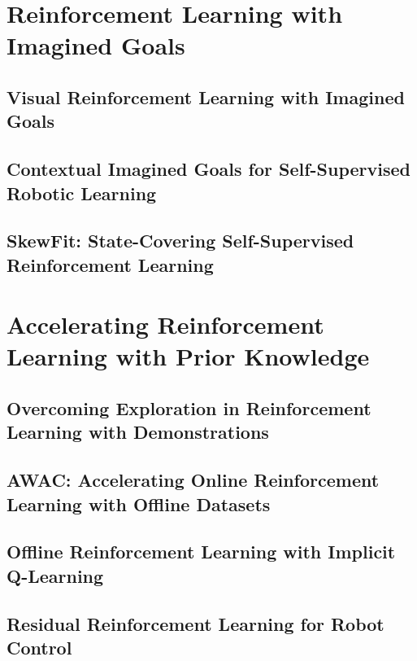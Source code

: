 \documentclass[ titlepage,numbers=noenddot,headinclude,
                footinclude=true,cleardoublepage=empty,abstractoff,
                BCOR=5mm,paper=letter,fontsize=12pt,
                american,
                openany
                ]{scrreprt}
\begin{document}

\part{Reinforcement Learning with Imagined Goals}

\chapter{Visual Reinforcement Learning with Imagined Goals}\label{chapter:rig}


\chapter{Contextual Imagined Goals for Self-Supervised Robotic Learning}\label{chapter:ccrig}

\chapter{SkewFit: State-Covering Self-Supervised Reinforcement Learning}\label{chapter:skewfit}

\part{Accelerating Reinforcement Learning with Prior Knowledge}

\chapter{Overcoming Exploration in Reinforcement Learning with Demonstrations}\label{chapter:bcddpg}

\chapter{AWAC: Accelerating Online Reinforcement Learning with Offline Datasets}\label{chapter:awac}

\chapter{Offline Reinforcement Learning with Implicit Q-Learning}\label{chapter:iql}

\chapter{Residual Reinforcement Learning for Robot Control}\label{chapter:residualrl}
\end{document}
